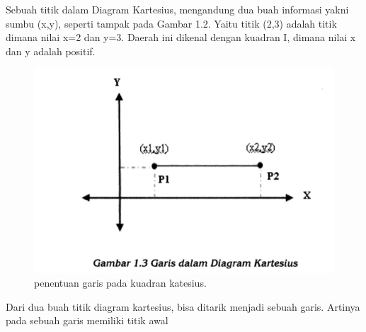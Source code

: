 Sebuah titik dalam Diagram Kartesius, mengandung dua buah informasi yakni sumbu (x,y), seperti tampak pada Gambar 1.2. 
Yaitu titik (2,3) adalah titik dimana nilai x=2 dan y=3. Daerah ini dikenal dengan kuadran I, dimana nilai x dan y adalah positif.
\begin{figure}[ht]
	\centerline{\includegraphics[width=1\textwidth]{figures/rahmi10.PNG}}
	\caption{penentuan garis pada kuadran katesius.}
	\label{rahmi10}
	\end{figure}

Dari dua buah titik diagram kartesius, bisa ditarik menjadi sebuah garis. Artinya pada sebuah garis memiliki titik awal


